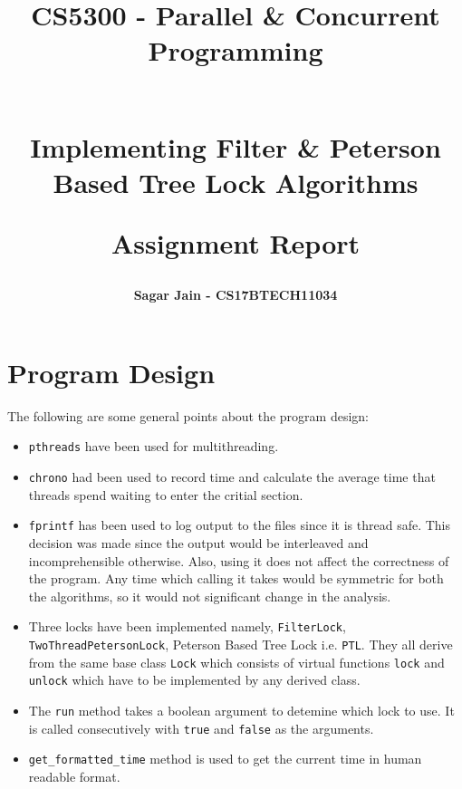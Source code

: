 \documentclass[a4paper,12pt]{report}
\begin{document}
\title{
\textbf{CS5300 - Parallel \& Concurrent Programming}\\~\\
\begin{large}
\textbf{Implementing Filter \& Peterson Based Tree Lock Algorithms}\\
\end{large}
\begin{large}
\textbf{Assignment Report}
\end{large}
}
\author{\textbf{Sagar Jain - CS17BTECH11034}\\}
\maketitle
\begin{large}
\tableofcontents
\end{large}
\newpage
\section{Program Design}
The following are some general points about the program design:
\begin{itemize}
\item \texttt{pthreads} have been used for multithreading.
\item \texttt{chrono} had been used to record time and calculate the average time that threads spend waiting to enter the critial section.
\item \texttt{fprintf} has been used to log output to the files since it is thread safe. This decision was made since the output would be interleaved and incomprehensible otherwise. Also, using it does not affect the correctness of the program. Any time which calling it takes would be symmetric for both the algorithms, so it would not significant change in the analysis.
\item Three locks have been implemented namely, \texttt{FilterLock},\\ \texttt{TwoThreadPetersonLock}, Peterson Based Tree Lock i.e. \texttt{PTL}. They all derive from the same base class \texttt{Lock} which consists of virtual functions \texttt{lock} and \texttt{unlock} which have to be implemented by any derived class.
\item The \texttt{run} method takes a boolean argument to detemine which lock to use. It is called consecutively with \texttt{true} and \texttt{false} as the arguments.
\item \texttt{get\_formatted\_time} method is used to get the current time in human readable format.
\end{itemize}
\end{document}
